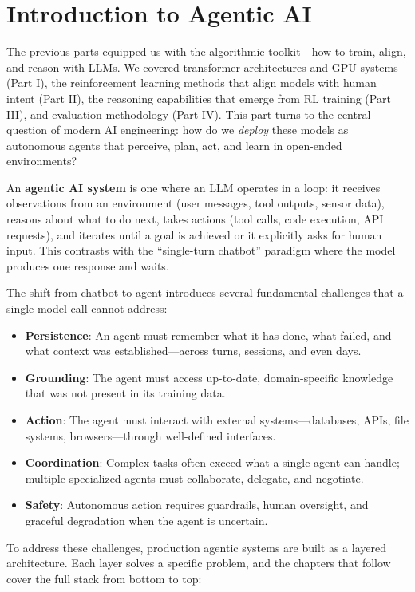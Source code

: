 \chapter{Introduction to Agentic AI}
\label{introduction-to-agentic-ai}

The previous parts equipped us with the algorithmic toolkit---how to train, align, and reason with LLMs. We covered transformer architectures and GPU systems (Part I), the reinforcement learning methods that align models with human intent (Part II), the reasoning capabilities that emerge from RL training (Part III), and evaluation methodology (Part IV). This part turns to the central question of modern AI engineering: how do we \emph{deploy} these models as autonomous agents that perceive, plan, act, and learn in open-ended environments?

An \textbf{agentic AI system} is one where an LLM operates in a loop: it receives observations from an environment (user messages, tool outputs, sensor data), reasons about what to do next, takes actions (tool calls, code execution, API requests), and iterates until a goal is achieved or it explicitly asks for human input. This contrasts with the ``single-turn chatbot'' paradigm where the model produces one response and waits.

The shift from chatbot to agent introduces several fundamental challenges that a single model call cannot address:

\begin{itemize}
  \item \textbf{Persistence}: An agent must remember what it has done, what failed, and what context was established---across turns, sessions, and even days.
  \item \textbf{Grounding}: The agent must access up-to-date, domain-specific knowledge that was not present in its training data.
  \item \textbf{Action}: The agent must interact with external systems---databases, APIs, file systems, browsers---through well-defined interfaces.
  \item \textbf{Coordination}: Complex tasks often exceed what a single agent can handle; multiple specialized agents must collaborate, delegate, and negotiate.
  \item \textbf{Safety}: Autonomous action requires guardrails, human oversight, and graceful degradation when the agent is uncertain.
\end{itemize}

To address these challenges, production agentic systems are built as a layered architecture. Each layer solves a specific problem, and the chapters that follow cover the full stack from bottom to top:

